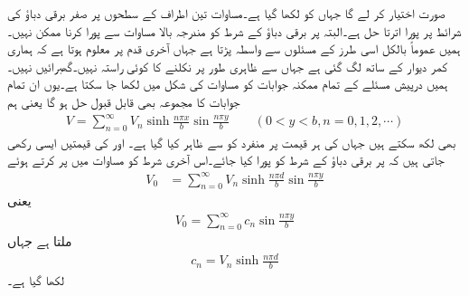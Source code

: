 صورت اختیار کر لے  گا جہاں  کو  لکھا گیا ہے۔مساوات  تین اطراف کے سطحوں پر صفر برقی دباؤ کی شرائط پر پورا اترتا حل ہے۔البتہ  پر  برقی دباؤ کے شرط کو مندرجہ بالا مساوات سے پورا کرنا ممکن نہیں۔ہمیں عموماً بالکل اسی طرز کے مسئلوں سے واسطہ پڑتا ہے جہاں آخری قدم پر معلوم ہوتا ہے کہ ہماری کمر دیوار کے ساتھ لگ گئی ہے جہاں سے ظاہری طور پر نکلنے کا کوئی راستہ نہیں۔گھبرائیں نہیں۔ہمیں درپیش مسئلے کے تمام ممکنہ جوابات کو مساوات  کی شکل میں لکھا جا سکتا ہے۔یوں ان تمام جوابات کا مجموعہ بھی قابل قبول حل ہو گا یعنی ہم 
\begin{align}\label{مساوات_لاپلاس_فوریئر_تسلسل_کا_حل}
V=\sum_{n=0}^{\infty} V_{n} \sinh \frac{n\pi x}{b} \sin \frac{n\pi y}{b} \quad \quad (0<y<b,n=0,1,2,\cdots)
\end{align}
بھی لکھ سکتے ہیں جہاں   کی ہر قیمت پر منفرد   کو  سے ظاہر کیا گیا ہے۔  اور  کی قیمتیں ایسی رکھی جاتی ہیں کہ   پر  برقی دباؤ کے شرط کو پورا کیا جائے۔اس آخری شرط کو مساوات میں پر کرتے ہوئے
\begin{align*}
V_0&=\sum_{n=0}^{\infty} V_{n} \sinh \frac{n\pi d}{b} \sin \frac{n\pi y}{b}
\end{align*}
یعنی
\begin{align}\label{مساوات_لاپلاس_فوریئر_تسلسل_حل}
V_0=\sum_{n=0}^{\infty} c_n\sin \frac{n\pi y}{b}
\end{align}
ملتا ہے جہاں 
\begin{align*}
c_n=V_n \sinh \frac{n\pi d}{b}
\end{align*}
لکھا گیا ہے۔


